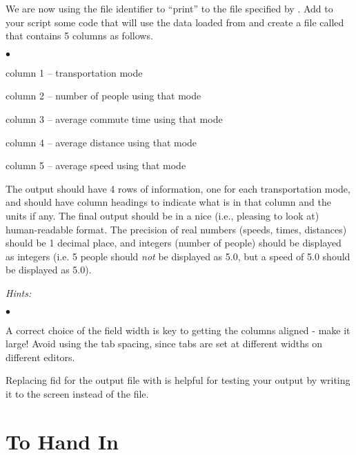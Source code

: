 \documentclass[letterpaper]{article}
\newcounter{lnum}
\newenvironment{abbrevlist}%
  {\begin{list}{$\bullet$}{\setlength{\leftmargin}{2em}%
               \setlength{\itemindent}{0em}%
               \setlength{\itemsep}{0pt}%
               \setlength{\parsep}{0pt}%
               \setlength{\topsep}{2pt}%
               \usecounter{lnum} } }{\end{list}}
\begin{document}
\begin{enumerate}
We are now using the file identifier to ``print'' to the file specified by . Add to your script
  some code that will use the data loaded from  and create a 
file called  that contains 5 columns as follows.  
\begin{abbrevlist}
\item column 1 -- transportation mode
\item column 2 -- number of people using that mode
\item column 3 -- average commute time using that mode
\item column 4 -- average distance using that mode  
\item column 5 -- average speed using that mode
\end{abbrevlist}
The output should have 4 rows of information, one for each transportation mode, and should have column headings to indicate what is in that column and the units if any.  The final output should be in a nice (i.e., pleasing to look at) human-readable format.  The precision of real numbers (speeds, times, distances) should be 1 decimal place, and integers (number of people) should be displayed as integers (i.e.   5 people should {\it not} be displayed as 5.0, but a speed of 5.0 should be displayed as 5.0).

{\it Hints:} 
\begin{abbrevlist}
 \item A correct  choice of the field width is key to getting the columns aligned - make it large! Avoid using the \mcode{\\t} tab spacing, since tabs are set at different widths on different editors. 
 \item Replacing fid for the output file with   is helpful for testing your output by writing it to the screen instead of the file.
\end{abbrevlist}



\end{enumerate}



\section{To Hand In}
\end{document}
